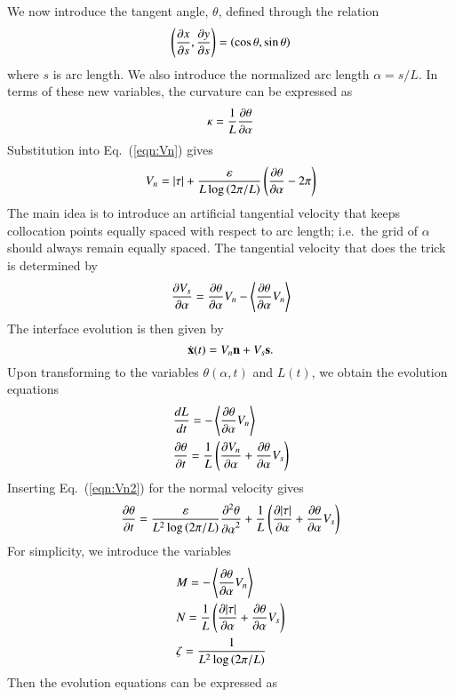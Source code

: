 \documentclass[preprint, 10pt]{elsarticle}
\begin{document}
We now introduce the tangent angle, $\theta$, defined through the relation
\begin{equation}
\left( \frac{\partial x}{\partial s}, \frac{\partial y}{\partial s} \right) = \left(\cos \theta, \sin \theta \right)
\end{equation}
where $s$ is arc length. We also introduce the normalized arc length $\alpha = s / L$. In terms of these new variables, the curvature can be expressed as
\begin{equation}
\kappa = \frac{1}{L} \frac{\partial \theta}{\partial \alpha}
\end{equation}
Substitution into Eq.~(\ref{eqn:Vn}) gives
\begin{equation}
\label{eqn:Vn2}
V_n = \lvert \tau \rvert + \frac{\varepsilon}{L \log \left(2\pi/L \right)}  \left(\frac{\partial \theta}{\partial \alpha} - 2 \pi \right)
\end{equation}
The main idea is to introduce an artificial tangential velocity that keeps collocation points equally spaced with respect to arc length; i.e.~the grid of $\alpha$ should always remain equally spaced. The tangential velocity that does the trick is determined by \cite{hou-low-she1994}
\begin{equation}
\frac{\partial V_s}{\partial \alpha} = \frac{\partial \theta}{\partial \alpha} V_n - \left< \frac{\partial \theta}{\partial \alpha} V_n \right>
\end{equation}
The interface evolution is then given by
\begin{equation}
\dot{{\mathbf{x}}}(t) = V_n {\mathbf{n}} + V_s {\mathbf{s}}.
\end{equation}
Upon transforming to the variables $\theta(\alpha,t)$ and $L(t)$, we obtain the evolution equations
\begin{align}
& \frac{d L}{d t} = - \left< \frac{\partial \theta}{\partial \alpha} V_n \right> \\
& \frac{\partial \theta}{\partial t} = \frac{1}{L} \left( \frac{\partial V_n}{\partial \alpha} + \frac{\partial \theta}{\partial \alpha} V_s \right)
\end{align}
Inserting Eq.~(\ref{eqn:Vn2}) for the normal velocity gives
\begin{equation}
\frac{\partial \theta}{\partial t} = \frac{\varepsilon}{L^{2} \log \left(2\pi/L \right)} \frac{\partial^2 \theta}{{\partial \alpha}^2} 
+ \frac{1}{L} \left( \frac{\partial \lvert \tau \rvert}{\partial \alpha} + \frac{\partial \theta}{\partial \alpha} V_s \right)
\end{equation}
For simplicity, we introduce the variables
\begin{align}
& M = - \left< \frac{\partial \theta}{\partial \alpha} V_n \right> \\
& N = \frac{1}{L} \left( \frac{\partial \lvert \tau \rvert}{\partial \alpha} + \frac{\partial \theta}{\partial \alpha} V_s \right) \\
& \zeta = \frac{1}{L^{2} \log \left(2\pi/L \right)}
\end{align}
Then the evolution equations can be expressed as
\end{document}
